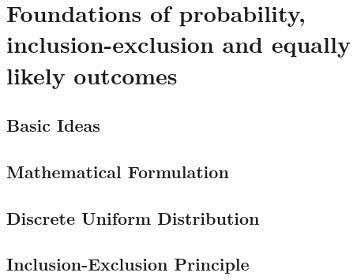 \section{Foundations of probability, inclusion-exclusion and equally likely outcomes}

\subsection{Basic Ideas}

\subsection{Mathematical Formulation}

\subsection{Discrete Uniform Distribution}

\subsection{Inclusion-Exclusion Principle}